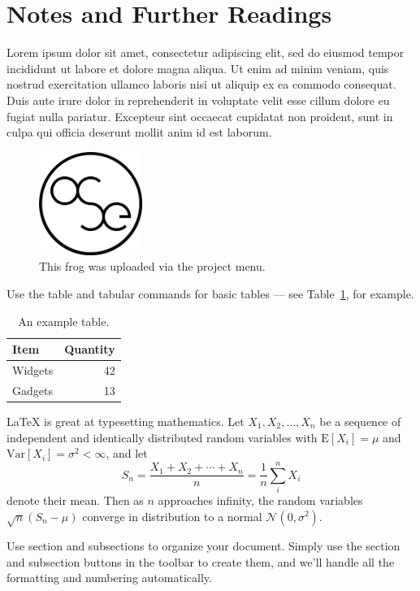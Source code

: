 \documentclass[a4paper]{article}
\begin{document}
\section*{Notes and Further Readings}

Lorem ipsum dolor sit amet, consectetur adipiscing elit, sed do eiusmod tempor incididunt ut labore et dolore magna aliqua. Ut enim ad minim veniam, quis nostrud exercitation ullamco laboris nisi ut aliquip ex ea commodo consequat. Duis aute irure dolor in reprehenderit in voluptate velit esse cillum dolore eu fugiat nulla pariatur. Excepteur sint occaecat cupidatat non proident, sunt in culpa qui officia deserunt mollit anim id est laborum.



\begin{figure}
\centering
\includegraphics[width=0.3\textwidth]{OSE_logo2.jpg}
\caption{\label{fig:frog}This frog was uploaded via the project menu.}
\end{figure}

Use the table and tabular commands for basic tables --- see Table~\ref{tab:widgets}, for example. 

\begin{table}
\centering
\begin{tabular}{l|r}
Item & Quantity \\\hline
Widgets & 42 \\
Gadgets & 13
\end{tabular}
\caption{\label{tab:widgets}An example table.}
\end{table}

\LaTeX{} is great at typesetting mathematics. Let $X_1, X_2, \ldots, X_n$ be a sequence of independent and identically distributed random variables with $\text{E}[X_i] = \mu$ and $\text{Var}[X_i] = \sigma^2 < \infty$, and let
\[S_n = \frac{X_1 + X_2 + \cdots + X_n}{n}
      = \frac{1}{n}\sum_{i}^{n} X_i\]
denote their mean. Then as $n$ approaches infinity, the random variables $\sqrt{n}(S_n - \mu)$ converge in distribution to a normal $\mathcal{N}(0, \sigma^2)$.


Use section and subsections to organize your document. Simply use the section and subsection buttons in the toolbar to create them, and we'll handle all the formatting and numbering automatically.
\end{document}
